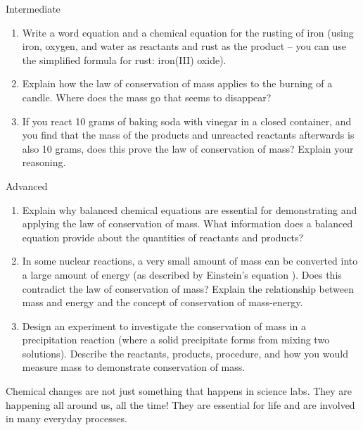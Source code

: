 \begin{tieredquestions}{Intermediate}
\begin{enumerate}
    \item  Write a word equation and a chemical equation for the rusting of iron (using iron, oxygen, and water as reactants and rust as the product – you can use the simplified formula for rust: iron(III) oxide).
    \item  Explain how the law of conservation of mass applies to the burning of a candle. Where does the mass go that seems to disappear?
    \item  If you react 10 grams of baking soda with vinegar in a closed container, and you find that the mass of the products and unreacted reactants afterwards is also 10 grams, does this prove the law of conservation of mass? Explain your reasoning.
\end{enumerate}
\end{tieredquestions}

\begin{tieredquestions}{Advanced}
\begin{enumerate}
    \item  Explain why balanced chemical equations are essential for demonstrating and applying the law of conservation of mass. What information does a balanced equation provide about the quantities of reactants and products? 
    \item  In some nuclear reactions, a very small amount of mass can be converted into a large amount of energy (as described by Einstein's equation ). Does this contradict the law of conservation of mass? Explain the relationship between mass and energy and the concept of conservation of mass-energy. 
    \item  Design an experiment to investigate the conservation of mass in a precipitation reaction (where a solid precipitate forms from mixing two solutions). Describe the reactants, products, procedure, and how you would measure mass to demonstrate conservation of mass.
\end{enumerate}
\end{tieredquestions}


\FloatBarrier

Chemical changes are not just something that happens in science labs. They are happening all around us, all the time!  They are essential for life and are involved in many everyday processes.

